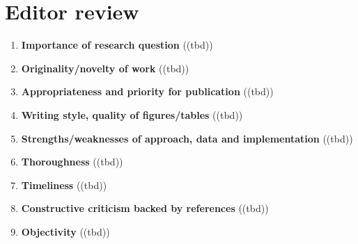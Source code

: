 \section{Editor review}\label{sec:editorreview}
\begin{enumerate}[resume]
    \item \textbf{Importance of research question} ((tbd))
    \item \textbf{Originality/novelty of work} ((tbd))
    \item \textbf{Appropriateness and priority for publication} ((tbd))
    \item \textbf{Writing style, quality of figures/tables} ((tbd))
    \item \textbf{Strengths/weaknesses of approach, data and implementation} ((tbd))
    \item \textbf{Thoroughness} ((tbd))
    \item \textbf{Timeliness} ((tbd))
    \item \textbf{Constructive criticism backed by references} ((tbd))
    \item \textbf{Objectivity} ((tbd))
\end{enumerate}
